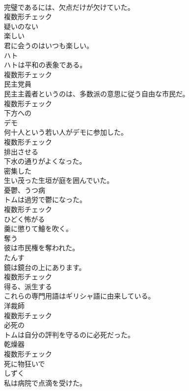 \documentclass[8pt]{extreport}
\begin{document}
\begin{CJK}{UTF8}{min}
\\	完璧であるには、欠点だけが欠けていた。	
\\	複数形チェック
\\	[形容詞]	疑いのない	
\\	[形容詞]	楽しい	
\\	君に会うのはいつも楽しい。	
\\	[名詞]	ハト	
\\	ハトは平和の表象である。	
\\	複数形チェック
\\	[名詞]	⺠主党員	
\\	民主主義者というのは、多数派の意思に従う自由な市民だ。	
\\	複数形チェック
\\	[形容詞]	下方への	
\\	[名詞]	デモ	
\\	何十人という若い人がデモに参加した。	
\\	複数形チェック
\\	[動詞]	排出させる	
\\	下水の通りがよくなった。	
\\	[形容詞]	密集した	
\\	生い茂った生垣が庭を囲んでいた。	
\\	[名詞]	憂鬱、うつ病	
\\	トムは過労で鬱になった。	
\\	複数形チェック
\\	[動詞]	ひどく怖がる	
\\	羹に懲りて鱠を吹く。	
\\	[動詞]	奪う	
\\	彼は市民権を奪われた。	
\\	[名詞]	たんす	
\\	鏡は鏡台の上にあります。	
\\	複数形チェック
\\	[動詞]	得る、派生する	
\\	これらの専門用語はギリシャ語に由来している。	
\\	[名詞]	洋裁師	
\\	複数形チェック
\\	[形容詞]	必死の	
\\	トムは自分の評判を守るのに必死だった。	
\\	[名詞]	乾燥器	
\\	複数形チェック
\\	[副詞]	死に物狂いで	
\\	[名詞]	しずく	
\\	私は病院で点滴を受けた。	

\end{CJK}
\end{document}
